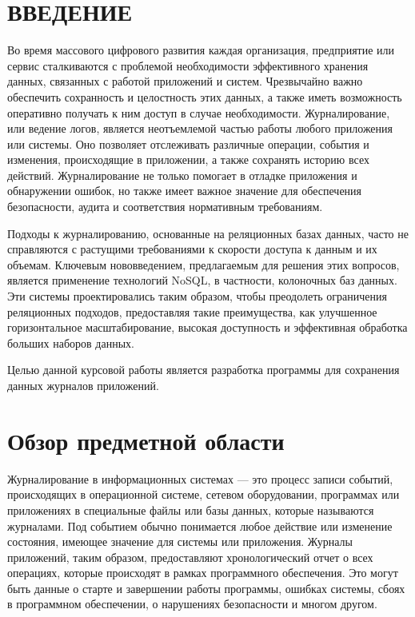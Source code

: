 \documentclass[14pt, russian]{scrartcl}
\newcommand{\anonsection}[1]{\cleardoublepage
\phantomsection
\addcontentsline{toc}{section}{\protect\numberline{}#1}
\section*{#1}\vspace*{2.5ex} %
}
\begin{document}

\setlength{\tabcolsep}{3pt}
\newpage
\setcounter{page}{2}

\newpage
\renewcommand\contentsname{\hfill{\normalfont{СОДЕРЖАНИЕ}}\hfill}  %
\tableofcontents
\newpage
\anonsection{ВВЕДЕНИЕ}  %

Во время массового цифрового развития каждая организация, предприятие или сервис сталкиваются с проблемой необходимости эффективного хранения данных, связанных с работой приложений и систем. Чрезвычайно важно обеспечить сохранность и целостность этих данных, а также иметь возможность оперативно получать к ним доступ в случае необходимости. Журналирование, или ведение логов, является неотъемлемой частью работы любого приложения или системы. Оно позволяет отслеживать различные операции, события и изменения, происходящие в приложении, а также сохранять историю всех действий. Журналирование не только помогает в отладке приложения и обнаружении ошибок, но также имеет важное значение для обеспечения безопасности, аудита и соответствия нормативным требованиям.

Подходы к журналированию, основанные на реляционных базах данных, часто не справляются с растущими требованиями к скорости доступа к данным и их объемам. Ключевым нововведением, предлагаемым для решения этих вопросов, является применение технологий NoSQL, в частности, колоночных баз данных. Эти системы проектировались таким образом, чтобы преодолеть ограничения реляционных подходов, предоставляя такие преимущества, как улучшенное горизонтальное масштабирование, высокая доступность и эффективная обработка больших наборов данных.

Целью данной курсовой работы является разработка программы для
сохранения данных журналов приложений.

\section{Обзор предметной области}

Журналирование в информационных системах --- это процесс записи событий, происходящих в операционной системе, сетевом оборудовании, программах или приложениях в специальные файлы или базы данных, которые называются журналами.
Под событием обычно понимается любое действие или изменение состояния, имеющее значение для системы или приложения.
Журналы приложений, таким образом, предоставляют хронологический отчет о всех операциях, которые происходят в рамках программного обеспечения.
Это могут быть данные о старте и завершении работы программы, ошибках системы, сбоях в программном обеспечении, о нарушениях безопасности и многом другом.
\end{document}
